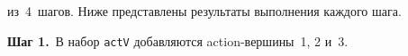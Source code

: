 из~4~шагов. Ниже представлены результаты выполнения каждого шага.





\textbf{{Шаг 1.}}\ В набор \verb"actV" добавляются action-вер\-ши\-ны~1, 2 и~3.











\pagebreak





\





\vspace*{-12pt}





\renewcommand{\figurename}{\protect\bf Таблица}




\setcounter{figure}{1}





